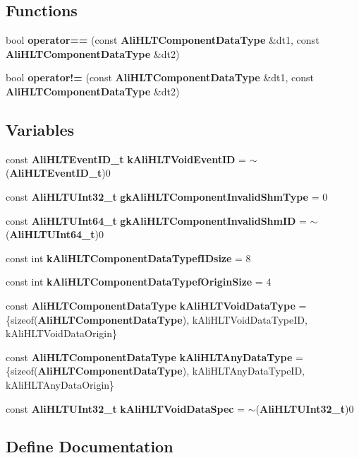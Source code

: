 \subsection*{Functions}
\begin{CompactItemize}
\item 
bool {\bf operator==} (const {\bf Ali\-HLTComponent\-Data\-Type} \&dt1, const {\bf Ali\-HLTComponent\-Data\-Type} \&dt2)
\item 
bool {\bf operator!=} (const {\bf Ali\-HLTComponent\-Data\-Type} \&dt1, const {\bf Ali\-HLTComponent\-Data\-Type} \&dt2)
\end{CompactItemize}
\subsection*{Variables}
\begin{CompactItemize}
\item 
const {\bf Ali\-HLTEvent\-ID\_\-t} {\bf k\-Ali\-HLTVoid\-Event\-ID} = $\sim$({\bf Ali\-HLTEvent\-ID\_\-t})0
\item 
const {\bf Ali\-HLTUInt32\_\-t} {\bf gk\-Ali\-HLTComponent\-Invalid\-Shm\-Type} = 0
\item 
const {\bf Ali\-HLTUInt64\_\-t} {\bf gk\-Ali\-HLTComponent\-Invalid\-Shm\-ID} = $\sim$({\bf Ali\-HLTUInt64\_\-t})0
\item 
const int {\bf k\-Ali\-HLTComponent\-Data\-Typef\-IDsize} = 8
\item 
const int {\bf k\-Ali\-HLTComponent\-Data\-Typef\-Origin\-Size} = 4
\item 
const {\bf Ali\-HLTComponent\-Data\-Type} {\bf k\-Ali\-HLTVoid\-Data\-Type} = \{sizeof({\bf Ali\-HLTComponent\-Data\-Type}), k\-Ali\-HLTVoid\-Data\-Type\-ID, k\-Ali\-HLTVoid\-Data\-Origin\}
\item 
const {\bf Ali\-HLTComponent\-Data\-Type} {\bf k\-Ali\-HLTAny\-Data\-Type} = \{sizeof({\bf Ali\-HLTComponent\-Data\-Type}), k\-Ali\-HLTAny\-Data\-Type\-ID, k\-Ali\-HLTAny\-Data\-Origin\}
\item 
const {\bf Ali\-HLTUInt32\_\-t} {\bf k\-Ali\-HLTVoid\-Data\-Spec} = $\sim$({\bf Ali\-HLTUInt32\_\-t})0
\end{CompactItemize}


\subsection{Define Documentation}
